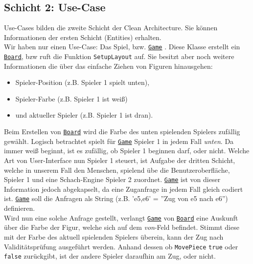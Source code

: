 \documentclass[
10pt, %
a4paper, %
oneside, %
headinclude,footinclude, %
BCOR5mm, %
]{scrartcl}
\begin{document}
\begin{onehalfspace}
\subsection{Schicht 2: Use-Case}
Use-Cases bilden die zweite Schicht der Clean Architecture. Sie können Informationen der ersten Schicht (Entities) erhalten.\\
Wir haben nur einen Use-Case: Das Spiel, bzw. \texttt{\href{https://github.com/schmida736/Chess-AdvancedSE/blob/main/Chess-AdvancedSE/Game\%20Elements/Game.cs}{Game}} . Diese Klasse erstellt ein \texttt{\href{https://github.com/schmida736/Chess-AdvancedSE/blob/main/Chess-AdvancedSE/Game\%20Elements/Board.cs}{Board}}, bzw ruft die Funktion \texttt{SetupLayout} auf. Sie besitzt aber noch weitere Informationen die über das einfache Ziehen von Figuren hinausgehen:
\begin{center}
	\begin{itemize}
		\item Spieler-Position (z.B. Spieler 1 spielt unten),
		\item Spieler-Farbe (z.B. Spieler 1 ist weiß)
		\item und aktueller Spieler (z.B. Spieler 1 ist dran).
	\end{itemize}
\end{center}
Beim Erstellen von \texttt{\href{https://github.com/schmida736/Chess-AdvancedSE/blob/main/Chess-AdvancedSE/Game\%20Elements/Board.cs}{Board}} wird die Farbe des unten spielenden Spielers zufällig gewählt. Logisch betrachtet spielt für \texttt{\href{https://github.com/schmida736/Chess-AdvancedSE/blob/main/Chess-AdvancedSE/Game\%20Elements/Game.cs}{Game}} Spieler 1 in jedem Fall \textit{unten}. Da immer weiß beginnt, ist es zufällig, ob Spieler 1 beginnen darf, oder nicht. Welche Art von User-Interface nun Spieler 1 steuert, ist Aufgabe der dritten Schicht, welche in unserem Fall den Menschen, spielend übe die Benutzeroberfläche, Spieler 1 und eine Schach-Engine Spieler 2 zuordnet. \texttt{\href{https://github.com/schmida736/Chess-AdvancedSE/blob/main/Chess-AdvancedSE/Game\%20Elements/Game.cs}{Game}} ist von dieser Information jedoch abgekapselt, da eine Zuganfrage in jedem Fall gleich codiert ist.
\texttt{\href{https://github.com/schmida736/Chess-AdvancedSE/blob/main/Chess-AdvancedSE/Game\%20Elements/Game.cs}{Game}} soll die Anfragen als String (z.B. 'e5,e6' = ''Zug von e5 nach e6'') definieren. \\
Wird nun eine solche Anfrage gestellt, verlangt \texttt{\href{https://github.com/schmida736/Chess-AdvancedSE/blob/main/Chess-AdvancedSE/Game\%20Elements/Game.cs}{Game}} von \texttt{\href{https://github.com/schmida736/Chess-AdvancedSE/blob/main/Chess-AdvancedSE/Game\%20Elements/Board.cs}{Board}} eine Auskunft über die Farbe der Figur, welche sich auf dem \textit{von}-Feld befindet. Stimmt diese mit der Farbe des aktuell spielenden Spielers überein, kann der Zug nach Validitätsprüfung ausgeführt werden. Anhand dessen ob \texttt{MovePiece} \texttt{true} oder \texttt{false} zurückgibt, ist der andere Spieler daraufhin am Zug, oder nicht.

\end{onehalfspace}
\end{document}
